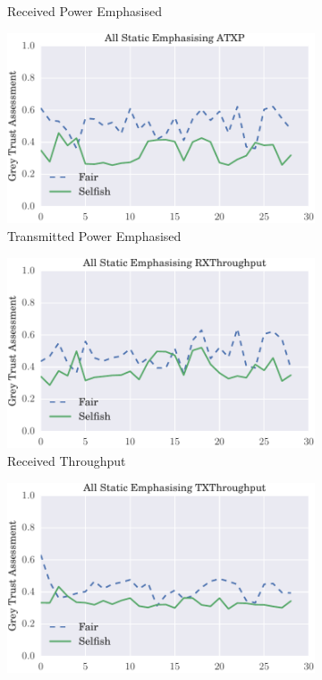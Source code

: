 \documentclass[runningheads,a4paper]{llncs}
\begin{document}
{{\begin{figure}
\begin{subfigure}{0.5\textwidth}
  \caption{Received Power Emphasised}
  \label{fig:beta_trust_allbut1}
\end{subfigure}
\begin{subfigure}{0.5\textwidth}
\centering
  \includegraphics[width=.8\linewidth]{img/trust_bella_static_emph_ATXP_BadMouthingPowerControl.pdf}
  \caption{Transmitted Power Emphasised}
  \label{fig:beta_trust_all_mobile}
\end{subfigure}
\begin{subfigure}{0.5\textwidth}
\centering
  \includegraphics[width=.8\linewidth]{img/trust_bella_static_emph_RXThroughput_BadMouthingPowerControl.pdf}
  \caption{Received Throughput}
  \label{fig:beta_trust_all_mobile}
\end{subfigure}
\begin{subfigure}{0.5\textwidth}
\centering
  \includegraphics[width=.8\linewidth]{img/trust_bella_static_emph_TXThroughput_BadMouthingPowerControl.pdf}

\end{subfigure}
\end{figure}}}
\end{document}
